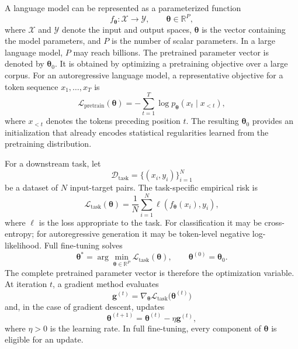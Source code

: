 A language model can be represented as a parameterized function
\begin{equation}
    f_{\boldsymbol{\theta}}:\mathcal{X}\rightarrow\mathcal{Y},
    \qquad
    \boldsymbol{\theta}\in\mathbb{R}^{P},
    \label{eq:peft-model-function}
\end{equation}
where $\mathcal{X}$ and $\mathcal{Y}$ denote the input and output spaces,
$\boldsymbol{\theta}$ is the vector containing the model parameters, and $P$
is the number of scalar parameters. In a large language model, $P$ may reach
billions. The pretrained parameter vector is denoted by
$\boldsymbol{\theta}_0$. It is obtained by optimizing a pretraining objective
over a large corpus. For an autoregressive language model, a representative
objective for a token sequence $x_1,\ldots,x_T$ is
\begin{equation}
    \mathcal{L}_{\mathrm{pretrain}}(\boldsymbol{\theta})
    =
    -\sum_{t=1}^{T}
    \log p_{\boldsymbol{\theta}}(x_t\mid x_{<t}),
    \label{eq:peft-pretraining-objective}
\end{equation}
where $x_{<t}$ denotes the tokens preceding position $t$. The resulting
$\boldsymbol{\theta}_0$ provides an initialization that already encodes
statistical regularities learned from the pretraining distribution.

For a downstream task, let
\begin{equation}
    \mathcal{D}_{\mathrm{task}}
    =
    \{(x_i,y_i)\}_{i=1}^{N}
    \label{eq:peft-downstream-dataset}
\end{equation}
be a dataset of $N$ input-target pairs. The task-specific empirical risk is
\begin{equation}
    \mathcal{L}_{\mathrm{task}}(\boldsymbol{\theta})
    =
    \frac{1}{N}\sum_{i=1}^{N}
    \ell\!\left(f_{\boldsymbol{\theta}}(x_i),y_i\right),
    \label{eq:peft-task-loss}
\end{equation}
where $\ell$ is the loss appropriate to the task. For classification it may
be cross-entropy; for autoregressive generation it may be token-level
negative log-likelihood. Full fine-tuning solves
\begin{equation}
    \boldsymbol{\theta}^{*}
    =
    \arg\min_{\boldsymbol{\theta}\in\mathbb{R}^{P}}
    \mathcal{L}_{\mathrm{task}}(\boldsymbol{\theta}),
    \qquad
    \boldsymbol{\theta}^{(0)}=\boldsymbol{\theta}_0.
    \label{eq:peft-full-ft}
\end{equation}
The complete pretrained parameter vector is therefore the optimization
variable. At iteration $t$, a gradient method evaluates
\begin{equation}
    \mathbf{g}^{(t)}
    =
    \nabla_{\boldsymbol{\theta}}
    \mathcal{L}_{\mathrm{task}}
    \bigl(\boldsymbol{\theta}^{(t)}\bigr)
    \label{eq:peft-full-gradient}
\end{equation}
and, in the case of gradient descent, updates
\begin{equation}
    \boldsymbol{\theta}^{(t+1)}
    =
    \boldsymbol{\theta}^{(t)}-\eta\mathbf{g}^{(t)},
    \label{eq:peft-gd-update}
\end{equation}
where $\eta>0$ is the learning rate. In full fine-tuning, every component of
$\boldsymbol{\theta}$ is eligible for an update.

